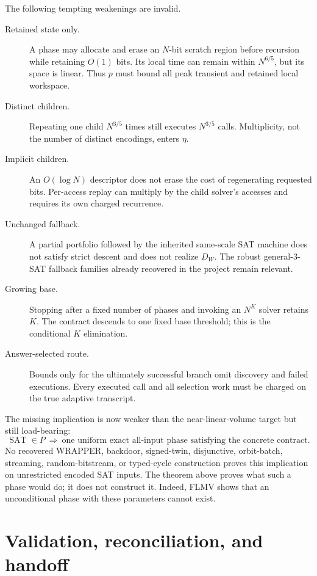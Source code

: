 \documentclass[11pt]{article}
\newcommand{\SAT}{\operatorname{SAT}}
\begin{document}
The following tempting weakenings are invalid.
\begin{description}
\item[Retained state only.]  A phase may allocate and erase an $N$-bit
scratch region before recursion while retaining $O(1)$ bits.  Its local time
can remain within $N^{6/5}$, but its space is linear.  Thus $p$ must bound all
peak transient and retained local workspace.
\item[Distinct children.]  Repeating one child $N^{3/5}$ times still executes
$N^{3/5}$ calls.  Multiplicity, not the number of distinct encodings, enters
$\eta$.
\item[Implicit children.]  An $O(\log N)$ descriptor does not erase the cost
of regenerating requested bits.  Per-access replay can multiply by the child
solver's accesses and requires its own charged recurrence.
\item[Unchanged fallback.]  A partial portfolio followed by the inherited
same-scale SAT machine does not satisfy strict descent and does not realize
$D_W$.  The robust general-3-SAT fallback families already recovered in the
project remain relevant.
\item[Growing base.]  Stopping after a fixed number of phases and invoking an
$N^K$ solver retains $K$.  The contract descends to one fixed base threshold;
this is the conditional $K$ elimination.
\item[Answer-selected route.]  Bounds only for the ultimately successful
branch omit discovery and failed executions.  Every executed call and all
selection work must be charged on the true adaptive transcript.
\end{description}

The missing implication is now weaker than the near-linear-volume target but
still load-bearing:
\[
 \boxed{\SAT\in P\ \Longrightarrow\
 \text{one uniform exact all-input phase satisfying the concrete contract}.}
\]
No recovered WRAPPER, backdoor, signed-twin, disjunctive, orbit-batch,
streaming, random-bitstream, or typed-cycle construction proves this
implication on unrestricted encoded SAT inputs.  The theorem above proves
what such a phase would do; it does not construct it.  Indeed, FLMV shows
that an unconditional phase with these parameters cannot exist.

\section{Validation, reconciliation, and handoff}
\end{document}
